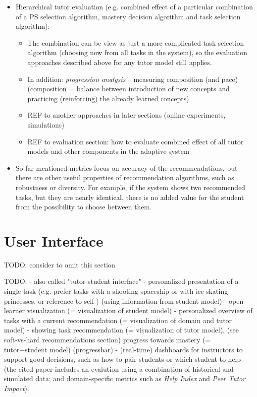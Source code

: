 \begin{itemize}
\item Hierarchical tutor evaluation (e.g. combined effect of a particular combination
  of a PS selection algorithm, mastery decision algorithm and task selection algorithm):
\begin{itemize}
\item The combination can be view as just a more complicated task selection algorithm
  (choosing now from all tasks in the system), so the evaluation approaches described
  above for any tutor model still applies.
\item In addition: \emph{progression analysis} -- measuring composition (and pace)
  (composition = balance between introduction of new concepts and practicing (reinforcing) the already learned concepts) \cite{progression-analysis}
\item REF to another approaches in later sections (online experiments, simulations)
\item REF to evaluation section: how to evaluate combined effect of all tutor
  models and other components in the adaptive system
\end{itemize}

\item %
So far mentioned metrics focus on accuracy of the recommendations,
but there are other useful properties of recommendation algorithms,
such as robustness or diversity.
For example, if the system shows two recommended tasks,
but they are nearly identical, there is no added value
for the student from the possibility to choose between them.
\end{itemize}



\section{User Interface}

TODO: consider to omit this section

TODO:
- also called "tutor-student interface"
- personalized presentation of a single task
(e.g. prefer tasks with a shooting spaceship or with ice-skating princesses,
or reference to self \cite[chapter 9]{its-domain-models})
(using information from student model)
- open learner visualization (= visualization of student model)
- personalized overview of tasks with a current recommendation (= visualization
of domain and tutor model)
- showing task recommendation (= visualization of tutor model),
  (see soft-vs-hard recommendations section)
  progress towards mastery (= tutor+student model)
  (progressbar)
- (real-time) dashboards for instructors to support good decisions,
  such as how to pair students or which student to help \cite{instructor-dashboard-realtime}
  (the cited paper includes an evalution using a combination of historical and simulated data;
  and domain-specific metrics such as \emph{Help Index} and \emph{Peer Tutor Impact}).

